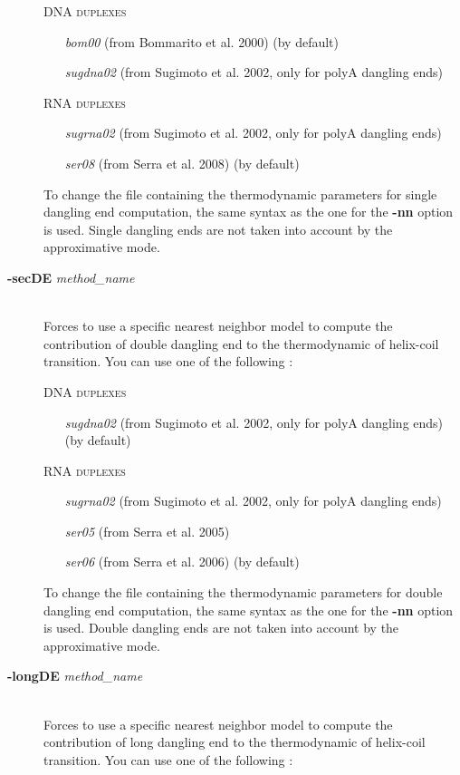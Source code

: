 \documentclass{article}
\begin{document}
\begin{description}
  \textsc{DNA duplexes}
    \begin{itemize}
    \item [\textit{bom00}] (from Bommarito et al. 2000)  (by default) 
    \item [\textit{sugdna02}] (from Sugimoto et al. 2002, only for polyA dangling ends)      
    \end{itemize}
  \textsc{RNA duplexes}
    \begin{itemize}
    \item [\textit{sugrna02}] (from Sugimoto et al. 2002, only for polyA dangling ends)
    \item [\textit{ser08}] (from Serra et al. 2008)  (by default) 		  
    \end{itemize}
  To change the file containing the thermodynamic parameters for single dangling end computation, the same syntax as the one for the \textbf{-nn} option is used.
  Single dangling ends are not taken into account by the approximative mode.   
\item [\textbf{-secDE} \textit{method\_name}]\mbox{}\\ 
  Forces to use a specific nearest neighbor model to compute the contribution of double dangling end to the thermodynamic of helix-coil transition. 
  You can use one of the following :
  
  \textsc{DNA duplexes}
    \begin{itemize}
    \item [\textit{sugdna02}] (from Sugimoto et al. 2002, only for polyA dangling ends) (by default)     
    \end{itemize}
  \textsc{RNA duplexes}
    \begin{itemize}
    \item [\textit{sugrna02}] (from Sugimoto et al. 2002, only for polyA dangling ends)
    \item [\textit{ser05}] (from Serra et al. 2005) 	
    \item [\textit{ser06}] (from Serra et al. 2006) (by default) 			 
    \end{itemize}
  To change the file containing the thermodynamic parameters for double dangling end computation, the same syntax as the one for the \textbf{-nn} option is used.
  Double dangling ends are not taken into account by the approximative mode.  
\item [\textbf{-longDE} \textit{method\_name}]\mbox{}\\ 
  Forces to use a specific nearest neighbor model to compute the contribution of long dangling end to the thermodynamic of helix-coil transition. 
  You can use one of the following :
  

\end{description}
\end{document}
